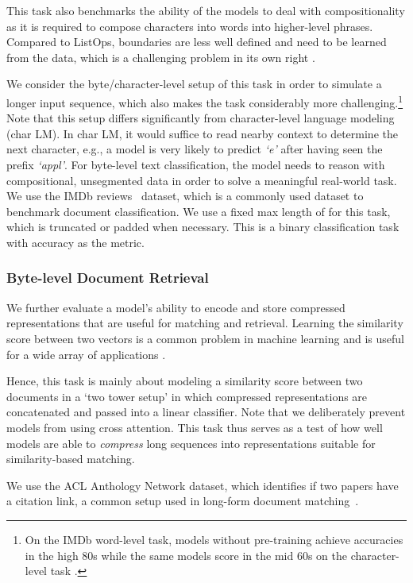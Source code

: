 \documentclass{article} \usepackage{iclr2021_conference,times}
\begin{document}
    This task also benchmarks the ability of the models to deal with compositionality as it is required to compose characters into words into higher-level phrases. Compared to ListOps, boundaries are less well defined and need to be learned from the data, which is a challenging problem in its own right \citep{Kawakami2019learning}.
    
    We consider the byte/character-level setup of this task in order to simulate a longer input sequence, which also makes the task considerably more challenging.\footnote{On the IMDb word-level task, models without pre-training achieve accuracies in the high 80s while the same models score in the mid 60s on the character-level task \citep{tay2020sparse}.} Note that this setup differs significantly from character-level language modeling (char LM). In char LM, it would suffice to read nearby context to determine the next character, e.g., a model is very likely to predict \textit{`e'} after having seen the prefix \textit{`appl'}. For byte-level text classification, the model needs to reason with compositional, unsegmented data in order to solve a meaningful real-world task. We use the IMDb reviews~\citep{maas-EtAl:2011:ACL-HLT2011} dataset, which is a commonly used dataset to benchmark document classification. We use a fixed max length of  for this task, which is truncated or padded when necessary. This is a binary classification task with accuracy as the metric.
    \subsubsection{Byte-level Document Retrieval}
    We further evaluate a model's ability to encode and store compressed representations that are useful for matching and retrieval. Learning the similarity score between two vectors is a common problem in machine learning and is useful for a wide array of applications \citep{guo2016deep}. 
    
    Hence, this task is mainly about modeling a similarity score between two documents in a `two tower setup' in which compressed representations are concatenated and passed into a linear classifier. Note that we deliberately prevent models from using cross attention. This task thus serves as a test of how well models are able to \textit{compress} long sequences into representations suitable for similarity-based matching. 
    
    We use the ACL Anthology Network \citep[AAN;][]{radev2013acl} dataset, which identifies if two papers have a citation link, a common setup used in long-form document matching~\citep{jiang2019semantic,DBLP:journals/corr/abs-2004-12297}. 
    
\end{document}
